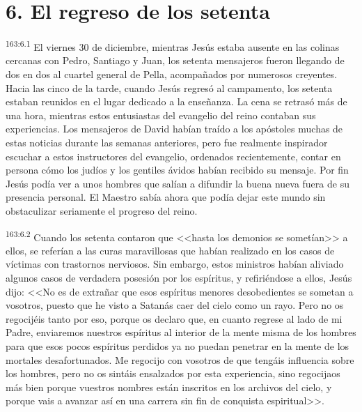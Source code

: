 \section*{6. El regreso de los setenta}
\par 
\textsuperscript{163:6.1} El viernes 30 de diciembre, mientras Jesús estaba ausente en las colinas cercanas con Pedro, Santiago y Juan, los setenta mensajeros fueron llegando de dos en dos al cuartel general de Pella, acompañados por numerosos creyentes. Hacia las cinco de la tarde, cuando Jesús regresó al campamento, los setenta estaban reunidos en el lugar dedicado a la enseñanza. La cena se retrasó más de una hora, mientras estos entusiastas del evangelio del reino contaban sus experiencias. Los mensajeros de David habían traído a los apóstoles muchas de estas noticias durante las semanas anteriores, pero fue realmente inspirador escuchar a estos instructores del evangelio, ordenados recientemente, contar en persona cómo los judíos y los gentiles ávidos habían recibido su mensaje. Por fin Jesús podía ver a unos hombres que salían a difundir la buena nueva fuera de su presencia personal. El Maestro sabía ahora que podía dejar este mundo sin obstaculizar seriamente el progreso del reino.

\par 
\textsuperscript{163:6.2} Cuando los setenta contaron que <<hasta los demonios se sometían>> a ellos, se referían a las curas maravillosas que habían realizado en los casos de víctimas con trastornos nerviosos. Sin embargo, estos ministros habían aliviado algunos casos de verdadera posesión por los espíritus, y refiriéndose a ellos, Jesús dijo: <<No es de extrañar que esos espíritus menores desobedientes se sometan a vosotros, puesto que he visto a Satanás caer del cielo como un rayo. Pero no os regocijéis tanto por eso, porque os declaro que, en cuanto regrese al lado de mi Padre, enviaremos nuestros espíritus al interior de la mente misma de los hombres para que esos pocos espíritus perdidos ya no puedan penetrar en la mente de los mortales desafortunados. Me regocijo con vosotros de que tengáis influencia sobre los hombres, pero no os sintáis ensalzados por esta experiencia, sino regocijaos más bien porque vuestros nombres están inscritos en los archivos del cielo, y porque vais a avanzar así en una carrera sin fin de conquista espiritual>>.

